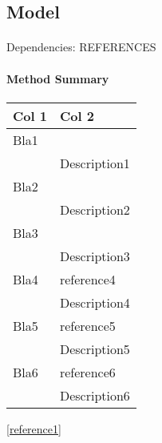 \subsection{Model}
\paragraph*{}
\paragraph*{}
Dependencies: REFERENCES
\paragraph*{Method Summary}
\paragraph*{}
\begin{longtable}{Lp{10cm}}
    \textbf{Col 1} & \textbf{Col 2} \\ \hline
	Bla1 &  \\
	& Description1 \\
	Bla2 &  \\    
	& Description2 \\
	Bla3 &  \\    
	& Description3 \\ 
	Bla4 & reference4 \\    
	& Description4 \\ 
	Bla5 & reference5 \\    
	& Description5 \\ 
	Bla6 & reference6 \\    
	& Description6 \\ \hline
\end{longtable}

\ref{reference1}